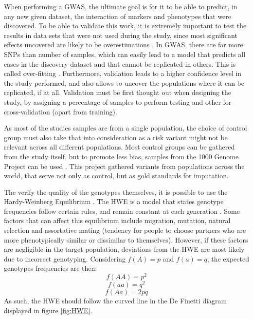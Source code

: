When performing a \gls{GWAS}, the ultimate goal is for it to be able to predict, in any new given dataset, the interaction of markers and phenotypes that were discovered. To be able to validate this work, it is extremely important to test the results in data sets that were not used during the study, since most significant effects uncovered are likely to be overestimations \cite{xu2003theoretical}. In \gls{GWAS}, there are far more \gls{SNP}s than number of samples, which can easily lead to a model that predicts all cases in the discovery dataset and that cannot be replicated in others. This is called over-fitting \cite{hayes2001prediction}. Furthermore, validation leads to a higher confidence level in the study performed, and also allows to uncover the populations where it can be replicated, if at all. Validation must be first thought out when designing the study, by assigning a percentage of samples to perform testing and other for cross-validation (apart from training).

As most of the studies samples are from a single population, the choice of control group must also take that into consideration as a risk variant might not be relevant across all different populations. Most control groups can be gathered from the study itself, but to promote less bias, samples from the 1000 Genome Project can be used \cite{10002012integrated}. This project gathered variants from populations across the world, that serve not only as control, but as gold standards for imputation.

The verify the quality of the genotypes themselves, it is possible to use the Hardy-Weinberg Equilibrium \cite{hosking2004detection}. The \gls{HWE} is a model that states genotype frequencies follow certain rules, and remain constant at each generation \cite{wigginton2005note}. Some factors that can affect this equilibrium include migration, mutation, natural selection and assortative mating (tendency for people to choose partners who are more phenotypically similar or dissimilar to themselves). However, if these factors are negligible in the target population, deviations from the \gls{HWE} are most likely due to incorrect genotyping. Considering $f(A) = p$ and $f(a) = q$, the expected genotypes frequencies are then:
\begin{equation}
	f(AA) = p^2
\end{equation}
\begin{equation}
f(aa) = q^2
\end{equation}
\begin{equation}
f(Aa) = 2pq
\end{equation}
As such, the \gls{HWE} should follow the curved line in the De Finetti diagram displayed in figure \ref{fig:HWE}.

